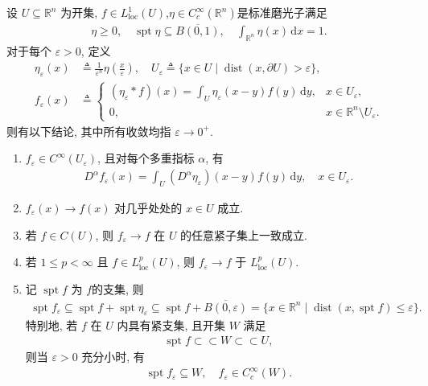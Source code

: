 \documentclass[../main.tex]{subfiles}
\begin{document}
\begin{theorem}[磨光子的性质]\label{theorem:appC-光滑算子的性质}
设 $U\subseteq\mathbb{R}^n$ 为开集, $f\in L^1_{\mathrm{loc}}(U)$,$\eta\in C_c^\infty(\mathbb{R}^n)$是标准磨光子满足
\begin{align*}
\eta\geqslant0,\quad
\operatorname{spt}\eta\subseteq\overline{B(0,1)},\quad
\int_{\mathbb{R}^n}\eta(x)\,\mathrm{d}x=1.
\end{align*}
对于每个 $\varepsilon>0$, 定义
\begin{align*}
\eta_\varepsilon(x)
&\triangleq\frac{1}{\varepsilon^n}\eta\left(\frac{x}{\varepsilon}\right),\quad
U_\varepsilon
\triangleq\{x\in U\mid\operatorname{dist}(x,\partial U)>\varepsilon\},\\
f_\varepsilon(x)
&\triangleq
\begin{cases}
(\eta_\varepsilon*f)(x)
=\displaystyle\int_U\eta_\varepsilon(x-y)f(y)\,\mathrm{d}y,
& x\in U_\varepsilon,\\
0, & x\in\mathbb{R}^n\setminus U_\varepsilon.
\end{cases}
\end{align*}
则有以下结论, 其中所有收敛均指 $\varepsilon\to0^+$.
\begin{enumerate}[(1)]
\item\label{theorem:appC-光滑算子的性质-1}
$f_\varepsilon\in C^\infty(U_\varepsilon)$, 且对每个多重指标 $\alpha$, 有
\begin{align*}
D^{\alpha}f_{\varepsilon}(x)=\int_U{(D^{\alpha}\eta _{\varepsilon})(x-y)f(y)\,\mathrm{d}y},\quad x\in U_{\varepsilon}.
\end{align*}

\item\label{theorem:appC-光滑算子的性质-2} $f_\varepsilon(x)\to f(x)$ 对几乎处处的 $x\in U$ 成立.

\item\label{theorem:appC-光滑算子的性质-3} 若 $f\in C(U)$, 则 $f_\varepsilon\to f$ 在 $U$ 的任意紧子集上一致成立.

\item\label{theorem:appC-光滑算子的性质-4} 若 $1\leqslant p<\infty$ 且 $f\in L^p_{\mathrm{loc}}(U)$, 则 $f_\varepsilon\to f$ 于 $L^p_{\mathrm{loc}}(U)$.

\item\label{theorem:appC-光滑算子的性质-6}
记 $\operatorname{spt}f$ 为 $f$的支集, 则
\begin{align*}
\operatorname{spt}f_\varepsilon
\subseteq\operatorname{spt}f+\operatorname{spt}\eta_\varepsilon\subseteq\operatorname{spt}f+\overline{B(0,\varepsilon)}=\{x\in\mathbb{R}^n\mid
\operatorname{dist}(x,\operatorname{spt}f)\leqslant\varepsilon\}.
\end{align*}
特别地, 若 $f$ 在 $U$ 内具有紧支集, 且开集 $W$ 满足
\begin{align*}
\operatorname{spt}f\subset\subset W\subset\subset U,
\end{align*}
则当 $\varepsilon>0$ 充分小时, 有
\begin{align*}
\operatorname{spt}f_\varepsilon\subseteq W,\quad
f_\varepsilon\in C_c^\infty(W).
\end{align*}


\end{enumerate}
\end{theorem}
\end{document}
